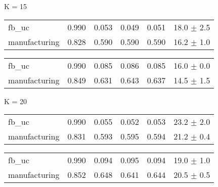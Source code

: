 \begin{table*}[h]
\begin{minipage}[h]{0.45\linewidth}
\begin{tabular}{llllll}
\hline
\end{tabular}
\end{minipage}


	\begin{minipage}[h]{0.45\linewidth} 
K = 15
\begin{tabular}{lrrrrr}
 fb\_uc          &    0.990 &       0.053 &    0.049 & 0.051 &		18.0 $\pm$ 2.5 \\
 manufacturing  &    0.828 &       0.590 &    0.590 &  0.590 & 	16.2 $\pm$ 1.0 \\


\hline
\end{tabular}
\end{minipage}
\hspace{0.8cm}
\begin{minipage}[h]{0.45\linewidth}
\begin{tabular}{lrrrrr}
 fb\_uc            &    0.990 &       0.085 &    0.086 & 	0.085 &	16.0 $\pm$ 0.0 \\
 manufacturing    &    0.849 &       0.631 &    0.643 &		0.637 &	 14.5 $\pm$ 1.5 \\

\hline
\end{tabular}
\end{minipage}


	\begin{minipage}[h]{0.45\linewidth} 
K = 20
\begin{tabular}{lrrrrr}
 fb\_uc           &    0.990 &       0.055 &    0.052 & 0.053 &		23.2 $\pm$ 2.0 \\
 manufacturing  &    0.831 &       0.593 &    0.595 & 	0.594 &	21.2 $\pm$ 0.4 \\

\hline
\end{tabular}
\end{minipage}
\hspace{0.8cm}
\begin{minipage}[h]{0.45\linewidth}
\begin{tabular}{lrrrrr}
 fb\_uc            &    0.990 &       0.094 &    0.095 &	0.094 &	 19.0 $\pm$ 1.0 \\
 manufacturing    &    0.852 &       0.648 &    0.641 & 	0.644 &	20.5 $\pm$ 0.5 \\

\hline

\end{tabular}
\end{minipage}
\end{table*}
